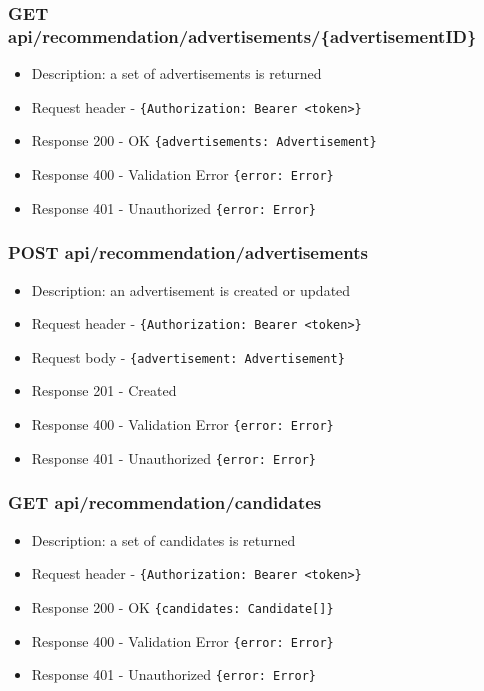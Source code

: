 \subsubsection{GET api/recommendation/advertisements/\{advertisementID\}}
\begin{itemize}
    \item Description: a set of advertisements is returned
    \item Request header - \verb|{Authorization: Bearer <token>}|
    \item Response 200 - OK \verb|{advertisements: Advertisement}|
    \item Response 400 - Validation Error \verb|{error: Error}|
    \item Response 401 - Unauthorized \verb|{error: Error}|
\end{itemize}

\subsubsection{POST api/recommendation/advertisements}
\begin{itemize}
    \item Description: an advertisement is created or updated
    \item Request header - \verb|{Authorization: Bearer <token>}|
    \item Request body - \verb|{advertisement: Advertisement}|
    \item Response 201 - Created
    \item Response 400 - Validation Error \verb|{error: Error}|
    \item Response 401 - Unauthorized \verb|{error: Error}|
\end{itemize}

\subsubsection{GET api/recommendation/candidates}
\begin{itemize}
    \item Description: a set of candidates is returned
    \item Request header - \verb|{Authorization: Bearer <token>}|
    \item Response 200 - OK \verb|{candidates: Candidate[]}|
    \item Response 400 - Validation Error \verb|{error: Error}|
    \item Response 401 - Unauthorized \verb|{error: Error}|
\end{itemize}

